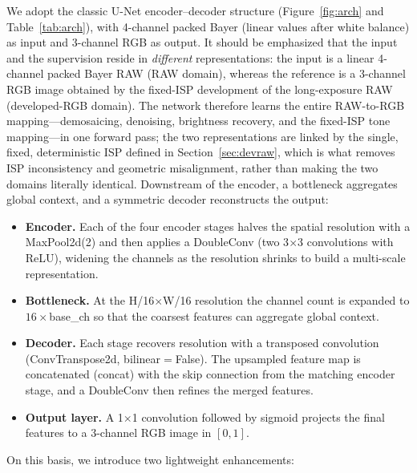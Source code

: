 \documentclass[remotesensing,article,accept,moreauthors]{Definitions/mdpi}
\begin{document}
We adopt the classic U-Net encoder--decoder structure (Figure~\ref{fig:arch} and Table~\ref{tab:arch}), with 4-channel packed Bayer (linear values after white balance) as input and 3-channel RGB as output. It should be emphasized that the input and the supervision reside in \emph{different} representations: the input is a linear 4-channel packed Bayer RAW (RAW domain), whereas the reference is a 3-channel RGB image obtained by the fixed-ISP development of the long-exposure RAW (developed-RGB domain). The network therefore learns the entire RAW-to-RGB mapping---demosaicing, denoising, brightness recovery, and the fixed-ISP tone mapping---in one forward pass; the two representations are linked by the single, fixed, deterministic ISP defined in Section~\ref{sec:devraw}, which is what removes ISP inconsistency and geometric misalignment, rather than making the two domains literally identical. Downstream of the encoder, a bottleneck aggregates global context, and a symmetric decoder reconstructs the output:

\begin{itemize}
\item \textbf{Encoder.} Each of the four encoder stages halves the spatial resolution with a MaxPool2d(2) and then applies a DoubleConv (two 3$\times$3 convolutions with ReLU), widening the channels as the resolution shrinks to build a multi-scale representation.
\item \textbf{Bottleneck.} At the H/16$\times$W/16 resolution the channel count is expanded to $16\times$base\_ch so that the coarsest features can aggregate global context.
\item \textbf{Decoder.} Each stage recovers resolution with a transposed convolution (ConvTranspose2d, bilinear$=$False). The upsampled feature map is concatenated (concat) with the skip connection from the matching encoder stage, and a DoubleConv then refines the merged features.
\item \textbf{Output layer.} A 1$\times$1 convolution followed by sigmoid projects the final features to a 3-channel RGB image in $[0,1]$.
\end{itemize}

On this basis, we introduce two lightweight enhancements:
\end{document}
